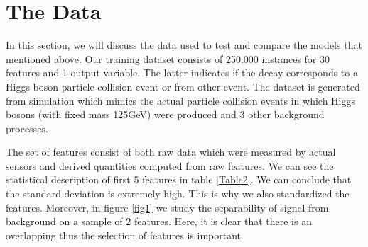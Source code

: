 \documentclass[10pt,conference,compsocconf]{IEEEtran}
\begin{document}
\section{The Data}
\label{S1}
In this section, we will discuss the data used to test and compare the models that mentioned above. Our training dataset consists of 250.000 instances for 30 features and 1 output variable. The latter indicates if the decay corresponds to a Higgs boson particle collision event or from other event. The dataset is generated from simulation which mimics the actual particle collision events in which Higgs bosons (with fixed mass 125GeV) were produced and 3 other background processes. 

The set of features consist of both raw data which were measured by actual sensors and derived quantities computed from raw features. We can see the statistical description of first 5 features in table \ref{Table2}. We can conclude that the standard deviation is extremely high. This is why we also standardized the features. Moreover, in figure \ref{fig1} we study the separability of signal from background on a sample of 2 features. Here, it is clear that there is an overlapping thus the selection of features is important. 
\end{document}

